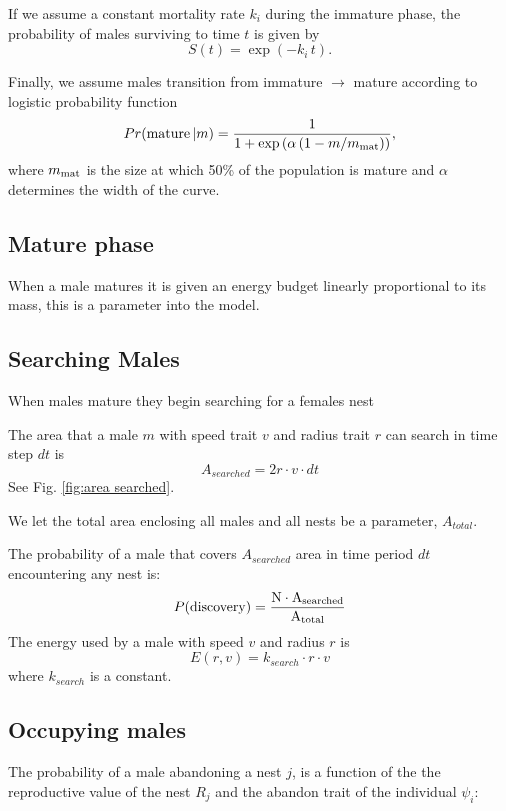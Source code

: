 \documentclass[a4paper,11pt]{article}
\begin{document}
If we assume a constant mortality rate $k_i$ during the immature phase, the probability of males surviving to time $t$ is given by
\begin{equation} \label{eq:surv_immature}
S(t) = \exp(-k_i \, t).
\end{equation}

Finally, we assume males transition from immature $\rightarrow$ mature according to logistic probability function
\begin{equation}\label{eq:allocation}
Pr({\rm mature} \, | m) = \frac1{1 + \exp\left(\alpha \left(1 - m / m_{\rm mat}\right)\right)},
\end{equation}
where $m_{\rm mat}$ is the size at which 50\% of the population is mature and $\alpha$ determines the width of the curve.

\subsection{Mature phase}
When a male matures it is given an energy budget linearly proportional to its mass, this is a parameter into the model.\\


\subsection{Searching Males}
When males mature they begin searching for a females nest


The area that a male $m$ with speed trait $v$ and radius trait $r$ can search in time step $dt$ is
\begin{equation}
    A_{searched} = 2r \cdot v \cdot dt
\end{equation}
See Fig. \ref{fig:area searched}.

We let the total area enclosing all males and all nests be a parameter, $A_{total}$.

The probability of a male that covers $A_{searched}$ area in time period $dt$ encountering any nest is:
\begin{equation}
    P(\rm {discovery}) = \frac {N \cdot A_{searched}} {A_{total}}
\end{equation}
\citep{Gillespie-1976}
The energy used by a male with speed $v$ and radius $r$ is 
\begin{equation}
    E(r,v) = k_{search} \cdot r \cdot v
\end{equation}
where $k_{search}$ is a constant.

\subsection{Occupying males}
The probability of a male abandoning a nest $j$, is a function of the  the reproductive value of the nest $R_j$ and the abandon trait of the individual $\psi_i$: 
\end{document}
